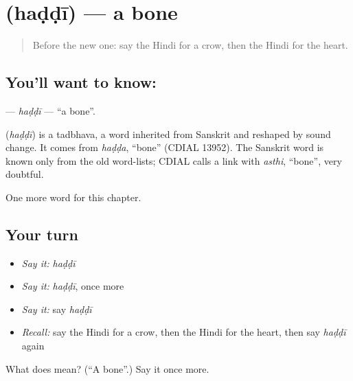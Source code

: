 \section[\texorpdfstring{\hi{हड्डी} (haḍḍī)}{हड्डी (haḍḍī)}]{ (haḍḍī) — a bone}

\label{lesson:HI-C199-haddi}



\begin{quote}
Before the new one: say the Hindi for a crow, then the Hindi for the heart.
\end{quote}

\subsection*{You'll want to know: }
\textbf{} — \emph{haḍḍī} — \textquotedblleft{}a bone\textquotedblright{}.

\begin{cousinweb}
\textbf{} (\emph{haḍḍī}) is a tadbhava, a word inherited from Sanskrit and reshaped by sound change. It comes from \emph{haḍḍa}, \textquotedblleft{}bone\textquotedblright{} (CDIAL 13952). The Sanskrit word is known only from the old word-lists; CDIAL calls a link with \emph{asthi}, \textquotedblleft{}bone\textquotedblright{}, very doubtful.
\end{cousinweb}

\begin{grammarlens}[title={What you've built}]
One more word for this chapter.
\end{grammarlens}

\subsection*{Your turn}
\begin{itemize}
\raggedright
  \item \emph{Say it:} \emph{haḍḍī}
  \item \emph{Say it:} \emph{haḍḍī}, once more
  \item \emph{Say it:} say \emph{haḍḍī}
  \item \emph{Recall:} say the Hindi for a crow, then the Hindi for the heart, then say \emph{haḍḍī} again
\end{itemize}

\begin{tcolorbox}[breakable,colback=teal!4,colframe=teal!35!black,title={Before you move on}]
What does  mean? (\textquotedblleft{}A bone\textquotedblright{}.) Say it once more.
\end{tcolorbox}
